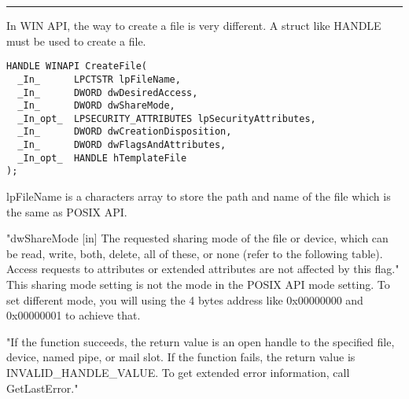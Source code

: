 \documentclass[10pt,draftclsnofoot,onecolumn,journal,compsoc]{IEEEtran}
\begin{document}
\noindent\rule{15.5cm}{0.4pt}
In WIN API, the way to create a file is very different. A struct like HANDLE must be used to create a file. \par
\begin{verbatim}
HANDLE WINAPI CreateFile(
  _In_      LPCTSTR lpFileName,
  _In_      DWORD dwDesiredAccess,
  _In_      DWORD dwShareMode,
  _In_opt_  LPSECURITY_ATTRIBUTES lpSecurityAttributes,
  _In_      DWORD dwCreationDisposition,
  _In_      DWORD dwFlagsAndAttributes,
  _In_opt_  HANDLE hTemplateFile
);
\end{verbatim}
lpFileName is a characters array to store the path and name of the file which is the same as POSIX API.\par
"dwShareMode [in] The requested sharing mode of the file or device, which can be read, write, both, delete, all of these, or none (refer to the following table). Access requests to attributes or extended attributes are not affected by this flag." This sharing mode setting is not the mode in the POSIX API mode setting. To set different mode, you will using the 4 bytes address like 0x00000000 and 0x00000001 to achieve that.\par
"If the function succeeds, the return value is an open handle to the specified file, device, named pipe, or mail slot. If the function fails, the return value is INVALID\_HANDLE\_VALUE. To get extended error information, call GetLastError."\par
\par
\end{document}
